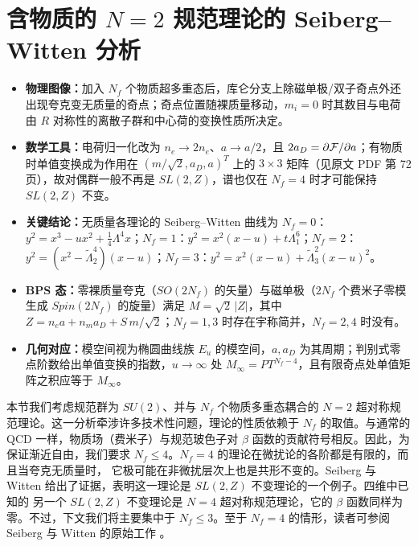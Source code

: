 
\section{含物质的 $N=2$ 规范理论的 Seiberg--Witten 分析}

\begin{keypoints}
\begin{itemize}
\item \textbf{物理图像：}加入 $N_f$ 个物质超多重态后，库仑分支上除磁单极/双子奇点外还出现夸克变无质量的奇点；奇点位置随裸质量移动，$m_i=0$ 时其数目与电荷由 $R$ 对称性的离散子群和中心荷的变换性质所决定。
\item \textbf{数学工具：}电荷归一化改为 $n_e\to2n_e$、$a\to a/2$，且 $2a_D=\partial{\cal F}/\partial a$；有物质时单值变换成为作用在 $(m/\sqrt2,a_D,a)^T$ 上的 $3\times3$ 矩阵（见原文 PDF 第 72 页），故对偶群一般不再是 $SL(2,Z)$，谱也仅在 $N_f=4$ 时才可能保持 $SL(2,Z)$ 不变。
\item \textbf{关键结论：}无质量各理论的 Seiberg--Witten 曲线为 $N_f=0$：$y^2=x^3-ux^2+\frac14\Lambda^4x$；$N_f=1$：$y^2=x^2(x-u)+t\Lambda_1^6$；$N_f=2$：$y^2=(x^2-\tilde\Lambda_2^4)(x-u)$；$N_f=3$：$y^2=x^2(x-u)+\tilde\Lambda_3^2(x-u)^2$。
\item \textbf{BPS 态：}零裸质量夸克（$SO(2N_f)$ 的矢量）与磁单极（$2N_f$ 个费米子零模生成 $Spin(2N_f)$ 的旋量）满足 $M=\sqrt2\,|Z|$，其中 $Z=n_ea+n_ma_D+S\,m/\sqrt2$；$N_f=1,3$ 时存在宇称简并，$N_f=2,4$ 时没有。
\item \textbf{几何对应：}模空间视为椭圆曲线族 $E_u$ 的模空间，$a,a_D$ 为其周期；判别式零点阶数给出单值变换的指数，$u\to\infty$ 处 $M_\infty=PT^{N_f-4}$，且有限奇点处单值矩阵之积应等于 $M_\infty$。
\end{itemize}
\end{keypoints}

本节我们考虑规范群为 $SU(2)$、并与 $N_f$ 个物质多重态耦合的 $N=2$
超对称规范理论。这一分析牵涉许多技术性问题，理论的性质依赖于 $N_f$
的取值。与通常的 QCD 一样，物质场（费米子）与规范玻色子对 $\beta$
函数的贡献符号相反。因此，为保证渐近自由，我们要求 $N_f
\leq 4$。$N_f =4$ 的理论在微扰论的各阶都是有限的，而且当夸克无质量时，
它极可能在非微扰层次上也是共形不变的。Seiberg 与 Witten
给出了证据，表明这一理论是 $SL(2,Z)$ 不变理论的一个例子。四维中已知的
另一个 $SL(2,Z)$ 不变理论是 $N=4$ 超对称规范理论，它的 $\beta$
函数同样为零。不过，下文我们将主要集中于 $N_f\leq 3$。至于 $N_f=4$
的情形，读者可参阅 Seiberg 与 Witten 的原始工作 \cite{SW2}。

